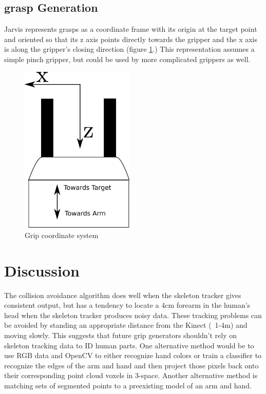 \documentclass[10pt]{article}
\begin{document}
\subsection{grasp Generation}\label{sec:graspgen} 
Jarvis represents grasps as a coordinate frame with its origin at the target point and oriented so that its z axis points directly towards the gripper and the x axis is along the gripper's closing direction (figure \ref{fig:gripper}.) This representation assumes a simple pinch gripper, but could be used by more complicated grippers as well. 

\begin{figure}
\includegraphics[width=0.48\textwidth]{figures/gripper_diagram.eps}  
\caption{Grip coordinate system}
\label{fig:gripper}
\end{figure}


\section{Discussion} \label{sec:discussion}
\par The collision avoidance algorithm does well when the skeleton tracker gives consistent output, but has a tendency to locate a 4cm forearm in the human's head when the skeleton tracker produces noisy data. These tracking problems can be avoided by standing an appropriate distance from the Kinect (~1-4m) and moving slowly. This suggests that future grip generators shouldn't rely on skeleton tracking data to ID human parts. One alternative method would be to use RGB data and OpenCV to either recognize hand colors %
or train a classifier to recognize the edges of the arm and hand and then project those pixels back onto their corresponding point cloud voxels in 3-space. Another alternative method is matching sets of segmented points to a preexisting model of an arm and hand.     
\end{document}
